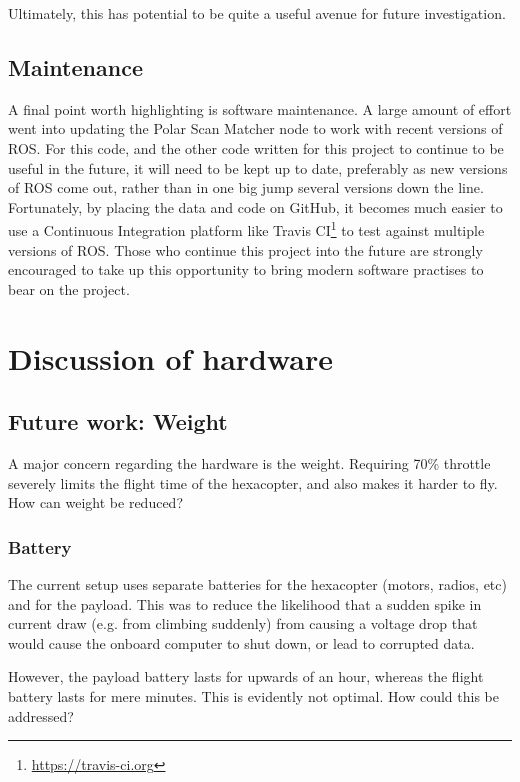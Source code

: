 \documentclass[12pt,oneside,a4paper]{book}
\begin{document}
Ultimately, this has potential to be quite a useful avenue for future
investigation.

\subsection{Maintenance}
\label{sec:maintenance}

A final point worth highlighting is software maintenance. A large
amount of effort went into updating the Polar Scan Matcher node to
work with recent versions of ROS. For this code, and the other code
written for this project to continue to be useful in the future, it
will need to be kept up to date, preferably as new versions of ROS
come out, rather than in one big jump several versions down the
line. Fortunately, by placing the data and code on GitHub, it becomes
much easier to use a Continuous Integration platform like
Travis CI\footnote{\url{https://travis-ci.org}} to test against
multiple versions of ROS. Those who continue this project into the
future are strongly encouraged to take up this opportunity to bring
modern software practises to bear on the project.
\newpage
\section{Discussion of hardware}
\label{sec:discussion-hardware}
\subsection{Future work: Weight}
\label{sec:weight}

A major concern regarding the hardware is the weight. Requiring 70\%
throttle severely limits the flight time of the hexacopter, and also
makes it harder to fly. How can weight be reduced?

\subsubsection{Battery}
\label{sec:battery}

The current setup uses separate batteries for the hexacopter (motors,
radios, etc) and for the payload. This was to reduce the likelihood
that a sudden spike in current draw (e.g. from climbing suddenly) from
causing a voltage drop that would cause the onboard computer to shut
down, or lead to corrupted data.

However, the payload battery lasts for upwards of an hour, whereas the
flight battery lasts for mere minutes. This is evidently not
optimal. How could this be addressed?
\end{document}
